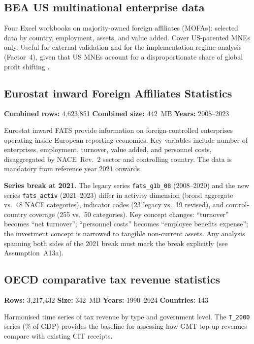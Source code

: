 \documentclass[11pt,a4paper]{article}
\newcommand{\code}[1]{\texttt{#1}}
\begin{document}
\subsection{BEA US multinational enterprise data}\label{app:bea}

Four Excel workbooks on majority-owned foreign affiliates (MOFAs): selected data by country, employment, assets, and value added. Cover US-parented MNEs only. Useful for external validation and for the implementation regime analysis (Factor~4), given that US MNEs account for a disproportionate share of global profit shifting \citep{torslov2023}.

\subsection{Eurostat inward Foreign Affiliates Statistics}\label{app:fats}

\textbf{Combined rows:} 4,623,851 \quad \textbf{Combined size:} 442~MB \quad \textbf{Years:} 2008--2023

Eurostat inward FATS provide information on foreign-controlled enterprises operating inside European reporting economies. Key variables include number of enterprises, employment, turnover, value added, and personnel costs, disaggregated by NACE~Rev.~2 sector and controlling country. The data is mandatory from reference year 2021 onwards.

\textbf{Series break at 2021.} The legacy series \code{fats\_g1b\_08} (2008--2020) and the new series \code{fats\_activ} (2021--2023) differ in activity dimension (broad aggregate vs.\ 48 NACE categories), indicator codes (23 legacy vs.\ 19 revised), and control-country coverage (255 vs.\ 50 categories). Key concept changes: ``turnover'' becomes ``net turnover''; ``personnel costs'' becomes ``employee benefits expense''; the investment concept is narrowed to tangible non-current assets. Any analysis spanning both sides of the 2021 break must mark the break explicitly (see Assumption~A13a).

\subsection{OECD comparative tax revenue statistics}\label{app:cts}

\textbf{Rows:} 3,217,432 \quad \textbf{Size:} 342~MB \quad \textbf{Years:} 1990--2024 \quad \textbf{Countries:} 143

Harmonised time series of tax revenue by type and government level. The \code{T\_2000} series (\% of GDP) provides the baseline for assessing how GMT top-up revenues compare with existing CIT receipts.
\end{document}
